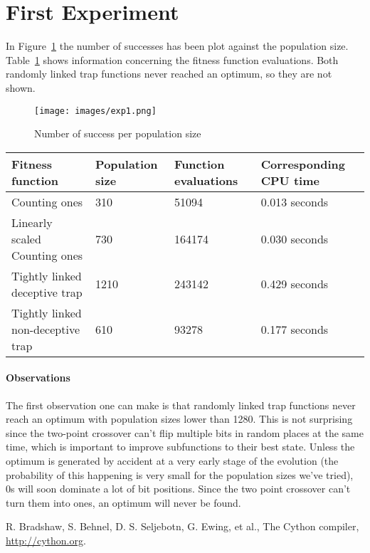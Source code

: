 \documentclass[12pt]{article}
\theoremstyle{definition}
\begin{document}
\section{First Experiment}
\label{ssec:exp1}
In Figure~\ref{fig:exp1} the number of successes has been plot against the population size.
Table~\ref{tab:exp1} shows information concerning the fitness function evaluations.
Both randomly linked trap functions never reached an optimum, so they are not shown.

\begin{figure}[!htb]
    \centering
    \texttt{[image: images/exp1.png]}
    \caption{Number of success per population size}
\label{fig:exp1}
\end{figure}

\begin{table}[!htb]
\begin{adjustwidth}{0cm}{}
\centering
\begin{tabular}{lp{2.5cm}p{2.5cm}p{2.8cm}}
\toprule[1.5pt]
\bf Fitness function & \bf Population size & \bf Function evaluations & \bf Corresponding CPU time\\\midrule
Counting ones & 310 & 51094 & 0.013 seconds \\
Linearly scaled Counting ones & 730 & 164174 & 0.030 seconds \\
Tightly linked deceptive trap & 1210 & 243142 & 0.429 seconds \\
Tightly linked non-deceptive trap & 610 & 93278 & 0.177 seconds \\
\bottomrule[1.25pt]
\end{tabular}\par
\bigskip
{}
\label{tab:exp1}
\end{adjustwidth}
\end{table}

\paragraph{Observations}
The first observation one can make is that randomly linked trap functions never reach an optimum with population sizes lower than 1280.
This is not surprising since the two-point crossover can't flip multiple bits
in random places at the same time, which is important to improve subfunctions to their best state.
Unless the optimum is generated by accident at a very early stage of the evolution
(the probability of this happening is very small for the population sizes we've tried),
0s will soon dominate a lot of bit positions.
Since the two point crossover can't turn them into ones, an optimum will never be found.


\begin{thebibliography}{9}

R. Bradshaw, S. Behnel, D. S. Seljebotn, G. Ewing, et al.,
The Cython compiler, \url{http://cython.org}.

\end{thebibliography}
\end{document}
